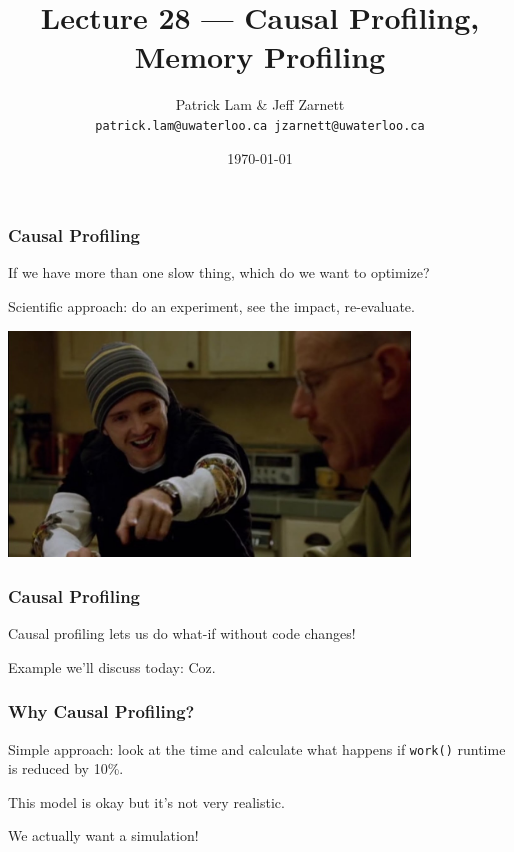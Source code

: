 
\usepackage{soul}

\title{Lecture 28 --- Causal Profiling, Memory Profiling }

\author{Patrick Lam \& Jeff Zarnett \\ \small \texttt{patrick.lam@uwaterloo.ca jzarnett@uwaterloo.ca}}
\date{\today}




\begin{frame}
  \titlepage
 \end{frame}



\begin{frame}
\frametitle{Causal Profiling}

If we have more than one slow thing, which do we want to optimize?

Scientific approach: do an experiment, see the impact, re-evaluate.

\begin{center}
	\includegraphics[width=0.8\textwidth]{images/yeah_science.jpg}
\end{center}

\end{frame}


\begin{frame}
\frametitle{Causal Profiling}

Causal profiling lets us do what-if without code changes!

Example we'll discuss today: \alert{Coz}.


\end{frame}


\begin{frame}
\frametitle{Why Causal Profiling?}

Simple approach: look at the time and calculate what happens if \texttt{work()} runtime is reduced by 10\%.

This model is okay but it's not very realistic.

We actually want a simulation!


\end{frame}


